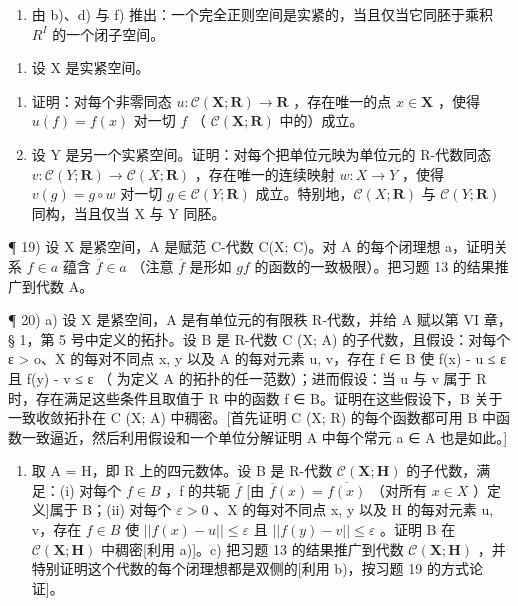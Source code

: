 \begin{enumerate}
\def\labelenumi{\alph{enumi})}
\setcounter{enumi}{6}
\tightlist
\item
  由 b)、d) 与 f) 推出：一个完全正则空间是实紧的，当且仅当它同胚于乘积 \(R^{I}\) 的一个闭子空间。
\end{enumerate}

\begin{enumerate}
\def\labelenumi{\arabic{enumi})}
\setcounter{enumi}{17}
\tightlist
\item
  设 X 是实紧空间。
\end{enumerate}

\begin{enumerate}
\def\labelenumi{\alph{enumi})}
\item
  证明：对每个非零同态 \(u: \mathcal{C}(\mathbf{X}; \mathbf{R}) \to \mathbf{R}\) ，存在唯一的点 \(x \in \mathbf{X}\) ，使得 \(u(f) = f(x)\) 对一切 \(f\) （ \(\mathcal{C}(\mathbf{X}; \mathbf{R})\) 中的）成立。
\item
  设 Y 是另一个实紧空间。证明：对每个把单位元映为单位元的 R-代数同态 \(v: \mathcal{C}(Y; \mathbf{R}) \to \mathcal{C}(X; \mathbf{R})\) ，存在唯一的连续映射 \(w: X \to Y\) ，使得 \(v(g) = g \circ w\) 对一切 \(g \in \mathcal{C}(Y; \mathbf{R})\) 成立。特别地，\(\mathcal{C}(X; \mathbf{R})\) 与 \(\mathcal{C}(Y; \mathbf{R})\) 同构，当且仅当 X 与 Y 同胚。
\end{enumerate}

¶ 19) 设 X 是紧空间，A 是赋范 C-代数 C(X; C)。对 A 的每个闭理想 a，证明关系 \(f \in a\) 蕴含 \(\overline{f} \in a\) （注意 \(\overline{f}\) 是形如 \(g f\) 的函数的一致极限）。把习题 13 的结果推广到代数 A。

¶ 20) a) 设 X 是紧空间，A 是有单位元的有限秩 R-代数，并给 A 赋以第 VI 章，§ 1，第 5 号中定义的拓扑。设 B 是 R-代数 C (X; A) 的子代数，且假设：对每个 ε \textgreater{} o、X 的每对不同点 x, y 以及 A 的每对元素 u, v，存在 f ∈ B 使 \textbar\textbar f(x) - u\textbar\textbar{} ≤ ε 且 \textbar\textbar f(y) - v\textbar\textbar{} ≤ ε （ \textbar\textbar{} \textbar\textbar{} 为定义 A 的拓扑的任一范数）；进而假设：当 u 与 v 属于 R 时，存在满足这些条件且取值于 R 中的函数 f ∈ B。证明在这些假设下，B 关于一致收敛拓扑在 C (X; A) 中稠密。{[}首先证明 C (X; R) 的每个函数都可用 B 中函数一致逼近，然后利用假设和一个单位分解证明 A 中每个常元 a ∈ A 也是如此。{]}

\begin{enumerate}
\def\labelenumi{\alph{enumi})}
\setcounter{enumi}{1}
\tightlist
\item
  取 A = H，即 R 上的四元数体。设 B 是 R-代数 \(\mathcal{C}(\mathbf{X}; \mathbf{H})\) 的子代数，满足：(i) 对每个 \(f \in B\) ，f 的共轭 \(\overline{f}\) {[}由 \(\overline{f}(x) = \overline{f(x)}\) （对所有 \(x \in X\) ）定义{]}属于 B；(ii) 对每个 \(\varepsilon > 0\) 、X 的每对不同点 x, y 以及 H 的每对元素 u, v，存在 \(f \in B\) 使 \(||f(x) - u|| \leqslant \varepsilon\) 且 \(||f(y) - v|| \leqslant \varepsilon\) 。证明 B 在 \(\mathcal{C}(\mathbf{X}; \mathbf{H})\) 中稠密{[}利用 a){]}。c) 把习题 13 的结果推广到代数 \(\mathcal{C}(\mathbf{X}; \mathbf{H})\) ，并特别证明这个代数的每个闭理想都是双侧的{[}利用 b)，按习题 19 的方式论证{]}。
\end{enumerate}

